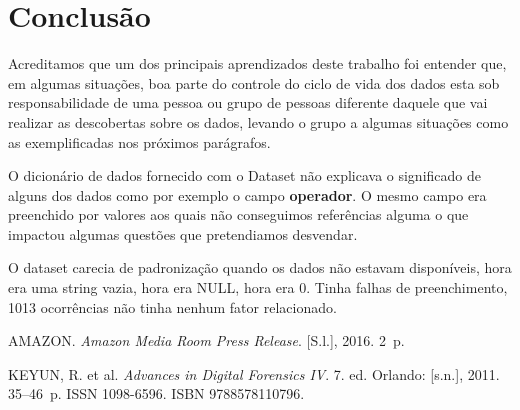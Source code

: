 \documentclass[conference]{IEEEtran}
\begin{document}
\section{Conclusão}

Acreditamos que um dos principais aprendizados deste trabalho foi entender que, em algumas situações, boa parte do controle do ciclo de vida dos dados esta sob responsabilidade
de uma pessoa ou grupo de pessoas diferente daquele que vai realizar as descobertas sobre os dados, levando o grupo a algumas situações como as exemplificadas nos próximos
parágrafos.

O dicionário de dados fornecido com o Dataset não explicava o significado de alguns dos dados como por exemplo o campo \textbf{operador}. O mesmo campo era preenchido por
valores aos quais não conseguimos referências alguma o que impactou algumas questões que pretendiamos desvendar.

O dataset carecia de padronização quando os dados não estavam disponíveis, hora era uma string vazia, hora era NULL, hora era 0. Tinha falhas de preenchimento, 1013 ocorrências
não tinha nenhum fator relacionado.



%
%
%
\begin{thebibliography}{1}

{AMAZON. \emph{{Amazon Media Room Press Release}}.
[S.l.], 2016. 2~p.}

{KEYUN, R. et al. \emph{{Advances in Digital Forensics IV}}. 7. ed. Orlando:
  [s.n.], 2011. 35--46~p.
ISSN 1098-6596.
ISBN 9788578110796.}

\end{thebibliography}

\end{document}
